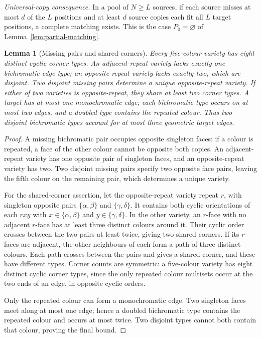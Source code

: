 \documentclass[11pt]{article}
\newtheorem{lemma}[theorem]{Lemma}
\theoremstyle{remark}
\begin{document}
\emph{Universal-copy consequence.} In a pool of $N\ge L$ sources, if each
source misses at most $d$ of the $L$ positions and at least $d$ source copies
each fit all $L$ target positions, a complete matching exists. This is the case $P_0=\varnothing$
of Lemma~\ref{lem:partial-matching}.

\begin{lemma}[Missing pairs and shared corners]\label{lem:cube-incidence}
Every five-colour variety has eight distinct cyclic corner types.
An adjacent-repeat variety lacks exactly one bichromatic edge type;
an opposite-repeat variety lacks exactly two, which are disjoint.
Two disjoint missing pairs determine a unique opposite-repeat variety.
If either of two varieties is opposite-repeat, they share at least two
corner types. A target has at most one monochromatic edge; each bichromatic
type occurs on at most two edges, and a doubled type contains the repeated
colour. Thus two disjoint bichromatic types account for at most three
geometric target edges.
\end{lemma}
\begin{proof}
A missing bichromatic pair occupies opposite singleton faces: if a colour
is repeated, a face of the other colour cannot be opposite both copies.
An adjacent-repeat variety has one opposite pair of singleton faces, and an
opposite-repeat variety has two. Two disjoint missing pairs specify two
opposite face pairs, leaving the fifth colour on the remaining pair,
which determines a unique variety.

For the shared-corner assertion, let the opposite-repeat variety repeat
$r$, with singleton opposite pairs $\{\alpha,\beta\}$ and
$\{\gamma,\delta\}$. It contains both cyclic orientations of each
$rxy$ with $x\in\{\alpha,\beta\}$ and $y\in\{\gamma,\delta\}$.
In the other variety, an $r$-face with no adjacent $r$-face has at least
three distinct colours around it. Their cyclic order crosses between the
two pairs at least twice, giving two shared corners. If its $r$-faces
are adjacent, the other neighbours of each form a path of three distinct
colours. Each path crosses between the pairs and gives a shared corner,
and these have different types. Corner counts are symmetric: a five-colour
variety has eight distinct cyclic corner types, since the only repeated
colour multisets occur at the two ends of an edge, in opposite cyclic orders.

Only the repeated colour can form a monochromatic edge. Two singleton
faces meet along at most one edge; hence a doubled bichromatic type
contains the repeated colour and occurs at most twice. Two disjoint types
cannot both contain that colour, proving the final bound.
\end{proof}
\end{document}
